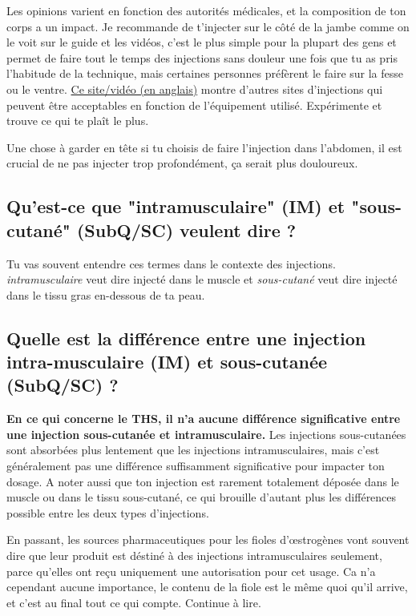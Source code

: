 \documentclass{article}
\begin{document}
Les opinions varient en fonction des autorités médicales, et la composition de ton corps a un impact. Je recommande de t'injecter sur le côté de la jambe comme on le voit sur le guide et les vidéos, c'est le plus simple pour la plupart des gens et permet de faire tout le temps des injections sans douleur une fois que tu as pris l'habitude de la technique, mais certaines personnes préfèrent le faire sur la fesse ou le ventre. \href{https://vertisis.com/articles/how-to-self-administer-a-subcutaneous-injection}{Ce site/vidéo (en anglais)} montre d'autres sites d'injections qui peuvent être acceptables en fonction de l'équipement utilisé. Expérimente et trouve ce qui te plaît le plus.

Une chose à garder en tête si tu choisis de faire l'injection dans l'abdomen, il est crucial de ne pas injecter trop profondément, ça serait plus douloureux.

\subsection{Qu'est-ce que "intramusculaire" (IM) et "sous-cutané" (SubQ/SC) veulent dire ?}

Tu vas souvent entendre ces termes dans le contexte des injections. \textit{intramusculaire} veut dire injecté dans le muscle et \textit{sous-cutané} veut dire injecté dans le tissu gras en-dessous de ta peau.

\subsection{Quelle est la différence entre une injection intra-musculaire (IM) et sous-cutanée (SubQ/SC) ?}

\textbf{En ce qui concerne le THS, il n'a aucune différence significative entre une injection sous-cutanée et intramusculaire.} Les injections sous-cutanées sont absorbées plus lentement que les injections intramusculaires, mais c'est généralement pas une différence suffisamment significative pour impacter ton dosage. A noter aussi que ton injection est rarement totalement déposée dans le muscle ou dans le tissu sous-cutané, ce qui brouille d'autant plus les différences possible entre les deux types d'injections.

En passant, les sources pharmaceutiques pour les fioles d'œstrogènes vont souvent dire que leur produit est déstiné à des injections intramusculaires seulement, parce qu'elles ont reçu uniquement une autorisation pour cet usage. Ca n'a cependant aucune importance, le contenu de la fiole est le même quoi qu'il arrive, et c'est au final tout ce qui compte. Continue à lire.
\end{document}
